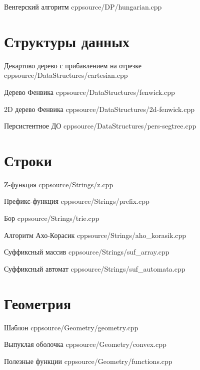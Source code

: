 \documentclass[landscape, 9pt, a4paper, oneside, twocolumn]{extarticle}
\begin{document}


\Algorithm
{Венгерский алгоритм}
{}
{}
{cpp}{source/DP/hungarian.cpp}
{}

\section{Структуры данных}
\Algorithm
{Декартово дерево с прибавлением на отрезке}
{}
{}
{cpp}{source/DataStructures/cartesian.cpp}
{}

\Algorithm
{Дерево Фенвика}
{}
{}
{cpp}{source/DataStructures/fenwick.cpp}
{}

\Algorithm
{2D дерево Фенвика}
{}
{}
{cpp}{source/DataStructures/2d-fenwick.cpp}
{}

\Algorithm
{Персистентное ДО}
{}
{}
{cpp}{source/DataStructures/pers-segtree.cpp}
{}

\section{Строки}

\Algorithm
{Z-функция}
{}
{}
{cpp}{source/Strings/z.cpp}
{}

\Algorithm
{Префикс-функция}
{}
{}
{cpp}{source/Strings/prefix.cpp}
{}

\Algorithm
{Бор}
{}
{}
{cpp}{source/Strings/trie.cpp}
{}

\Algorithm
{Алгоритм Ахо-Корасик}
{}
{}
{cpp}{source/Strings/aho_korasik.cpp}
{}

\Algorithm
{Суффиксный массив}
{}
{}
{cpp}{source/Strings/suf_array.cpp}
{}

\Algorithm
{Суффиксный автомат}
{}
{}
{cpp}{source/Strings/suf_automata.cpp}
{}

\section{Геометрия}

\Algorithm
{Шаблон}
{}
{}
{cpp}{source/Geometry/geometry.cpp}
{}

\Algorithm
{Выпуклая оболочка}
{}
{}
{cpp}{source/Geometry/convex.cpp}
{}

\Algorithm
{Полезные функции}
{}
{}
{cpp}{source/Geometry/functions.cpp}
{}
\end{document}
